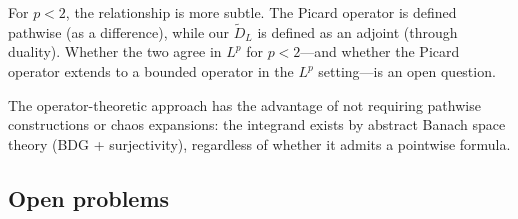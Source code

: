 \documentclass[11pt,a4paper]{article}
\theoremstyle{plain}
\theoremstyle{definition}
\theoremstyle{remark}
\begin{document}
For $p < 2$, the relationship is more subtle.  The Picard
operator is defined pathwise (as a difference), while our
$\widetilde{D}_L$ is defined as an adjoint (through duality).
Whether the two agree in $L^p$ for $p < 2$---and whether the
Picard operator extends to a bounded operator in the
$L^p$ setting---is an open question.

The operator-theoretic approach has the advantage of not
requiring pathwise constructions or chaos expansions: the
integrand exists by abstract Banach space theory (BDG +
surjectivity), regardless of whether it admits a
pointwise formula.


\subsection{Open problems}
\end{document}
